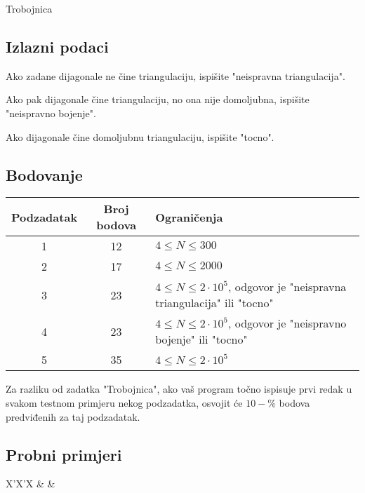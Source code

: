 \begin{statement}[
  problempoints=110,
  timelimit=2 sekunde,
  memorylimit=512 MiB,
]{Trobojnica}
\subsection*{Izlazni podaci}
Ako zadane dijagonale ne čine triangulaciju, ispišite "neispravna triangulacija".

Ako pak dijagonale čine triangulaciju, no ona nije domoljubna, ispišite "neispravno bojenje".

Ako dijagonale čine domoljubnu triangulaciju, ispišite "tocno".

\subsection*{Bodovanje}
{\renewcommand{\arraystretch}{1.4}
  \setlength{\tabcolsep}{6pt}
  \begin{tabular}{ccl}
 Podzadatak & Broj bodova & Ograničenja \\ \midrule
  1 & 12 & $4 \le N \le 300$ \\
  2 & 17 & $4 \le N \le 2000$ \\
  3 & 23 & $4 \le N \le 2\cdot10^5$, odgovor je "neispravna triangulacija" ili "tocno" \\
  4 & 23 & $4 \le N \le 2\cdot10^5$, odgovor je "neispravno bojenje" ili "tocno" \\
  5 & 35 & $4 \le N \le 2\cdot10^5$
\end{tabular}}

Za razliku od zadatka "Trobojnica", ako vaš program točno ispisuje prvi redak u svakom testnom primjeru nekog podzadatka, osvojit će $10-\%$ bodova predviđenih za taj podzadatak.

\subsection*{Probni primjeri}
\begin{tabularx}{\textwidth}{X'X'X}
 &
 &
\end{tabularx}




\end{statement}

